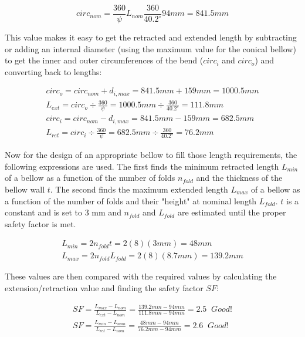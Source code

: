 \begin{equation}
    circ_{nom}=\frac{360}{\psi}L_{nom}\frac{360}{40.2^\circ}94mm=841.5mm
\end{equation}

This value makes it easy to get the retracted and extended length by subtracting or adding an internal diameter (using the maximum value for the conical bellow) to get the inner and outer circumferences of the bend ($circ_i$ and $circ_o$) and converting back to lengths:

\begin{gather}
    circ_{o}=circ_{nom}+d_{i,max}=841.5 mm+159 mm=1000.5 mm
    \\
    L_{ext}=circ_{o}\div\frac{360}{\psi}=1000.5 mm \div\frac{360}{40.2^\circ}=111.8 mm
    \\
    circ_{i}=circ_{nom}-d_{i,max}=841.5mm-159 mm =682.5 mm
    \\
    L_{ret}=circ_{i}\div\frac{360}{\psi}=682.5 mm\div\frac{360}{40.2^\circ}=76.2 mm
\end{gather}

Now for the design of an appropriate bellow to fill those length requirements, the following expressions are used. The first finds the minimum retracted length $L_{min}$ of a bellow as a function of the number of folds $n_{fold}$ and the thickness of the bellow wall $t$. The second finds the maximum extended length $L_{max}$ of a bellow as a function of the number of folds and their "height" at nominal length $L_{fold}$. $t$ is a constant and is set to 3 mm and $n_{fold}$ and $L_{fold}$ are estimated until the proper safety factor is met.

\begin{gather}
    L_{min}=2n_{fold}t=2(8)(3mm)=48 mm \label{eq:bellow_min}
    \\
    L_{max}=2n_{fold}L_{fold}=2(8)(8.7 mm)=139.2 mm \label{eq:bellow_max}
\end{gather}

These values are then compared with the required values by calculating the extension/retraction value and finding the safety factor $SF$:

\begin{gather}
    SF=\frac{L_{max}-L_{nom}}{L_{ext}-L_{nom}}=\frac{139.2mm-94mm}{111.8mm-94mm}=2.5 \;\;Good! \label{eq:bellow_sf1}
    \\
    SF=\frac{L_{min}-L_{nom}}{L_{ret}-L_{nom}}=\frac{48mm-94mm}{76.2mm-94mm}=2.6 \;\;Good! \label{eq:bellow_sf2}
\end{gather}

